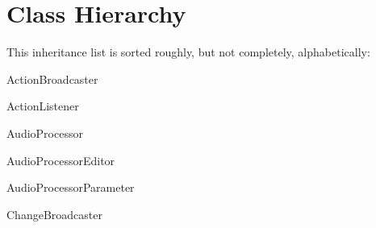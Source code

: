 \section{Class Hierarchy}
This inheritance list is sorted roughly, but not completely, alphabetically\+:\begin{DoxyCompactList}
\item Action\+Broadcaster\begin{DoxyCompactList}
\item {}
\item {}
\end{DoxyCompactList}
\item Action\+Listener\begin{DoxyCompactList}
\item {}
\end{DoxyCompactList}
\item Audio\+Processor\begin{DoxyCompactList}
\item {}
\item {}
\end{DoxyCompactList}
\item Audio\+Processor\+Editor\begin{DoxyCompactList}
\item {}
\end{DoxyCompactList}
\item Audio\+Processor\+Parameter\begin{DoxyCompactList}
\item {}
\end{DoxyCompactList}
\item Change\+Broadcaster\begin{DoxyCompactList}
\item {}
\item {}
\begin{DoxyCompactList}
\item {}

\end{DoxyCompactList}
\end{DoxyCompactList}
\end{DoxyCompactList}
